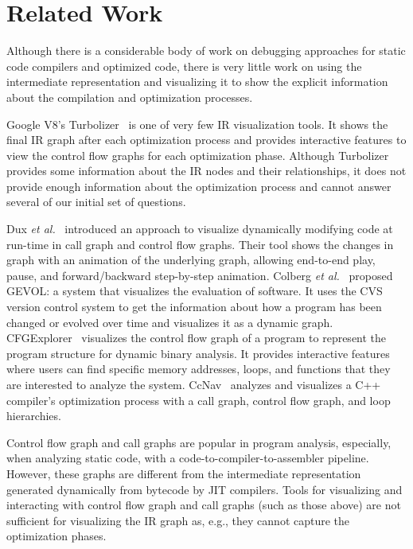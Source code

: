 \documentclass[runningheads]{llncs}
\begin{document}
\section{Related Work}\label{sec:related-work}

Although there is a considerable body of work on debugging approaches for static code compilers and optimized code, there is very little work on using the intermediate representation and visualizing it to show the explicit information about the compilation and optimization processes.

Google V8's Turbolizer~\cite{lukeolney2019turbolizer,jimenez2020intro} is one of very few IR visualization tools. It shows the final IR graph after each optimization process and provides interactive features to view the control flow graphs for each optimization phase.  Although Turbolizer provides some information about the IR nodes and their relationships, it does not provide enough information about the optimization process and cannot answer several of our initial set of questions.

Dux {\it et al.}~\cite{DBLP:conf/iwpc/DuxIDFK05} introduced an approach to visualize dynamically modifying code at run-time in call graph and control flow graphs. Their tool shows the changes in graph with an animation of the underlying graph, allowing  end-to-end play, pause, and forward/backward step-by-step animation.
Colberg {\it et al.}~\cite{DBLP:conf/softvis/CollbergKNPW03} proposed 
GEVOL: a system that visualizes the evaluation of software. It uses the CVS version control system to get the information about how a program has been changed or evolved over time and visualizes it as a dynamic graph. 
CFGExplorer~\cite{DBLP:journals/cgf/DevkotaI18} visualizes the control flow graph of a program to represent the program structure for dynamic binary analysis. It provides interactive features where users can find specific memory addresses, loops, and functions that they are interested to analyze the system.
CcNav~\cite{DBLP:journals/tvcg/DevkotaAKLI21}  analyzes and visualizes a C++ compiler's optimization process with a call graph, control flow graph, and loop hierarchies.

Control flow graph and call graphs are popular in program analysis, especially, when analyzing  static code, with a 
code-to-compiler-to-assembler pipeline. However, these graphs are different from the intermediate representation generated dynamically from bytecode by JIT compilers. Tools for visualizing and interacting with control flow graph and call graphs (such as those above) are not sufficient for visualizing the IR graph as, e.g., they cannot capture the optimization phases.
\end{document}
